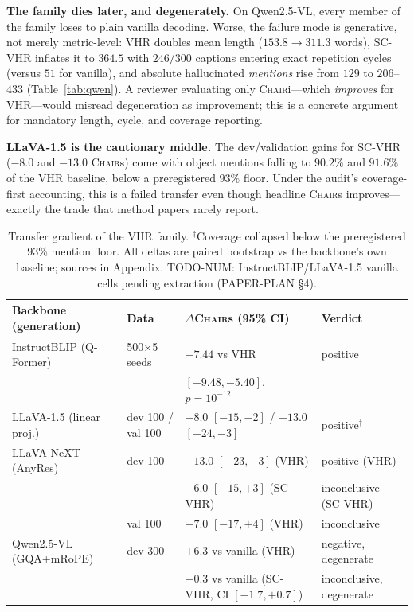 \documentclass[11pt]{article}
\newcommand{\chair}{\textsc{Chair}}
\newcommand{\vhr}{VHR}
\newcommand{\scvhr}{SC-VHR}
\begin{document}
\textbf{The family dies later, and degenerately.} On Qwen2.5-VL, every member of the family loses to plain vanilla decoding. Worse, the failure mode is generative, not merely metric-level: \vhr{} doubles mean length ($153.8\to311.3$ words), \scvhr{} inflates it to $364.5$ with $246/300$ captions entering exact repetition cycles (versus $51$ for vanilla), and absolute hallucinated \emph{mentions} rise from $129$ to $206$--$433$ (Table~\ref{tab:qwen}). A reviewer evaluating only \chair{i}---which \emph{improves} for \vhr{}---would misread degeneration as improvement; this is a concrete argument for mandatory length, cycle, and coverage reporting.

\textbf{LLaVA-1.5 is the cautionary middle.} The dev/validation gains for \scvhr{} ($-8.0$ and $-13.0$ \chair{s}) come with object mentions falling to $90.2\%$ and $91.6\%$ of the \vhr{} baseline, below a preregistered $93\%$ floor. Under the audit's coverage-first accounting, this is a failed transfer even though headline \chair{s} improves---exactly the trade that method papers rarely report.

\begin{table}[t]
\centering\small
\begin{tabular}{llll}
\toprule
Backbone (generation) & Data & $\Delta$\chair{s} (95\% CI) & Verdict \\
\midrule
InstructBLIP (Q-Former) & 500$\times$5 seeds & $-7.44$ vs \vhr{} & positive \\
 & & $[-9.48,-5.40]$, $p{=}10^{-12}$ & \\
LLaVA-1.5 (linear proj.) & dev 100 / val 100 & $-8.0$ $[-15,-2]$ / $-13.0$ $[-24,-3]$ & positive$^{\dagger}$ \\
LLaVA-NeXT (AnyRes) & dev 100 & $-13.0$ $[-23,-3]$ (\vhr{}) & positive (\vhr{}) \\
 & & $-6.0$ $[-15,+3]$ (\scvhr{}) & inconclusive (\scvhr{}) \\
 & val 100 & $-7.0$ $[-17,+4]$ (\vhr{}) & inconclusive \\
Qwen2.5-VL (GQA+mRoPE) & dev 300 & $+6.3$ vs vanilla (\vhr{}) & negative, degenerate \\
 & & $-0.3$ vs vanilla (\scvhr{}, CI $[-1.7,+0.7]$) & inconclusive, degenerate \\
\bottomrule
\end{tabular}
\caption{Transfer gradient of the \vhr{} family. $^{\dagger}$Coverage collapsed below the preregistered 93\% mention floor. All deltas are paired bootstrap vs the backbone's own baseline; sources in Appendix. TODO-NUM: InstructBLIP/LLaVA-1.5 vanilla cells pending extraction (PAPER-PLAN \S4).}
\label{tab:gradient}
\end{table}
\end{document}
